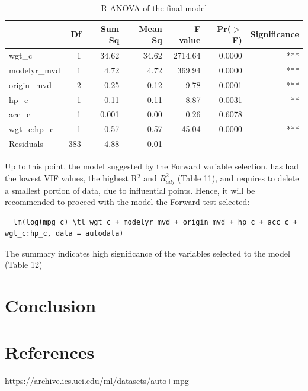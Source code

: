 \documentclass{article}
\newcommand{\mt}[1]{\ensuremath{#1}}
\newcommand{\uf}[2]{#1\mt{^{#2}}}
\newcommand{\tl}{\mt{\thicksim} }
\begin{document}
\begin{table}[ht]
\centering
\begin{tabular}{lrrrrrr}
  \hline
 & Df & Sum Sq & Mean Sq & F value & Pr($>$F) & Significance \\ 
  \hline
wgt\_c & 1 & 34.62 & 34.62 & 2714.64 & 0.0000 & *** \\ 
  modelyr\_mvd & 1 & 4.72 & 4.72 & 369.94 & 0.0000 & *** \\ 
  origin\_mvd & 2 & 0.25 & 0.12 & 9.78 & 0.0001 & *** \\ 
  hp\_c & 1 & 0.11 & 0.11 & 8.87 & 0.0031 & ** \\ 
  acc\_c & 1 & 0.001 & 0.00 & 0.26 & 0.6078 & \\ 
  wgt\_c:hp\_c & 1 & 0.57 & 0.57 & 45.04 & 0.0000 & *** \\ 
  Residuals & 383 & 4.88 & 0.01 &  &  & \\ 
   \hline
\end{tabular}
\caption{R ANOVA of the final model}
\label{tab:anovafinalmodel}
\end{table}

Up to this point, the model suggested by the Forward variable selection, has had the lowest VIF values, the highest \uf{R}{2} and $R^2_{adj}$ (Table 11), and requires to delete a smallest portion of data, due to influential points.  Hence, it will be recommended to proceed with the model the Forward test selected:

\begin{verbatim}
  lm(log(mpg_c) \tl wgt_c + modelyr_mvd + origin_mvd + hp_c + acc_c + wgt_c:hp_c, data = autodata)
\end{verbatim}

The summary indicates high significance of the variables selected to the model (Table 12)


\newpage

\section{Conclusion}



\newpage

\section{References}

https://archive.ics.uci.edu/ml/datasets/auto+mpg
\end{document}
